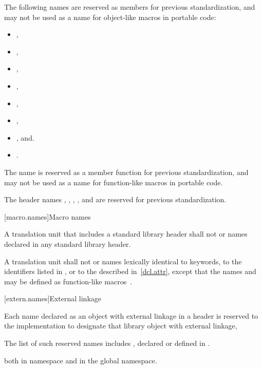 \pnum
The following names are reserved as members for previous standardization,
and may not be used as a name for object-like macros in portable code:
\begin{itemize}
\item {} ,
\item {} ,
\item {} ,
\item {} ,
\item {} ,
\item {} ,
\item {} , and.
\item {} .
\end{itemize}

\pnum
The name   is reserved as a
member function for previous standardization, and may not be used as a name for
function-like macros in portable code.

\pnum
The header names
,
,
,
, and
are reserved for previous standardization.

[macro.names]{Macro names}

\pnum
{}%
%
A translation unit that includes a standard library header shall not
 or  names declared in any standard
library header.

\pnum
{}%
A translation unit shall not  or 
names lexically identical
to keywords,
to the identifiers listed in , or
to the  described in~\ref{dcl.attr},
except that the names  and  may be
defined as function-like macros~.

[extern.names]{External linkage}

\pnum
Each name declared as an object with external linkage
%
in a header is reserved to the implementation to designate that library
object with external linkage,%
%
\begin{footnote}
The list of such reserved names includes
, declared or defined in .
\end{footnote}
both in namespace  and in the global namespace.

